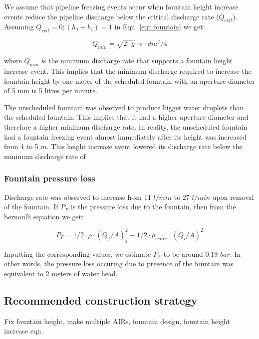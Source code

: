 \documentclass[tc, manuscript]{copernicus}
\begin{document}
We assume that pipeline freezing events occur when fountain height increase events reduce the pipeline discharge
below the critical discharge rate ($Q_{crit}$). Assuming $Q_{crit} = 0; (h_f - h_i) = 1$ in Eqn.
\ref{eqn:fountain} we get: 

\begin{equation}
  \label{eqn:fountain_min}
  Q_{min} = \sqrt{2 \cdot g } \cdot \pi \cdot dia^2/4
\end{equation}

where $Q_{min}$ is the minimum discharge rate that supports a fountain height increase event. This implies that
the minimum discharge required to increase the fountain height by one meter of the scheduled fountain with an
aperture diameter of 5 mm is 5 litres per minute.

The unscheduled fountain was observed to produce bigger water droplets than the scheduled fountain. This implies
that it had a higher aperture diameter and therefore a higher minimum discharge rate. In reality, the
unscheduled fountain had a fountain freezing event almost immediately after its height was increased from 4 to 5
$m$. This height increase event lowered its discharge rate below the minimum discharge rate of   

\subsubsection{Fountain pressure loss}

Discharge rate was observed to increase from 11 $l/min$ to 27 $l/min$ upon removal of the fountain. If $P_F$ is
the pressure loss due to the fountain, then from the bernoulli equation we get:

\begin{equation}
   P_F = 1/2 \cdot \rho \cdot (Q_f/A)_f^2 - 1/2 \cdot \rho_{water} \cdot (Q_i/A)^2
\end{equation}

Inputting the corresponding values, we estimate $P_F$ to be around 0.19 $bar$. In other words, the pressure loss
occuring due to presence of the fountain was equivalent to 2 meters of water head.


\subsection{Recommended construction strategy}

Fix fountain height, make multiple AIRs, fountain design, fountain height increase eqn.
\end{document}
